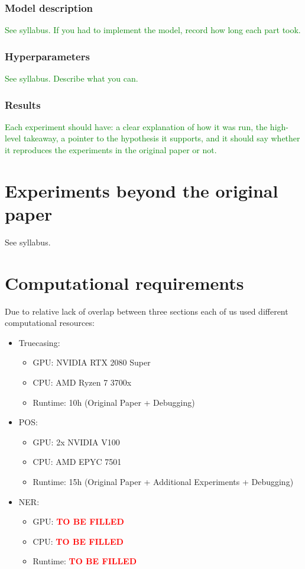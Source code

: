 \documentclass[11pt,a4paper]{article}
\begin{document}
    \subsubsection{Model description}
    \textcolor{green}{See syllabus. If you had to implement the model, record how long each part took.}

    \subsubsection{Hyperparameters}
    \textcolor{green}{See syllabus. Describe what you can.}

    \subsubsection{Results}
    \textcolor{green}{Each experiment should have: a clear explanation of how it was run, the high-level takeaway, a pointer to the hypothesis it supports, and it should say whether it reproduces the experiments in the original paper or not.}

\section{Experiments beyond the original paper}
See syllabus.

\section{Computational requirements}
Due to relative lack of overlap between three sections each of us used different computational resources:
\begin{itemize}
    \item Truecasing:
    \begin{itemize}
        \item GPU: NVIDIA RTX 2080 Super
        \item CPU: AMD Ryzen 7 3700x
        \item Runtime: 10h (Original Paper + Debugging)
    \end{itemize}
    \item POS:
    \begin{itemize}
        \item GPU: 2x NVIDIA V100
        \item CPU: AMD EPYC 7501
        \item Runtime: 15h (Original Paper + Additional Experiments + Debugging)
    \end{itemize}
    \item NER:
    \begin{itemize}
        \item GPU: \textbf{\textcolor{red}{TO BE FILLED}}
        \item CPU: \textbf{\textcolor{red}{TO BE FILLED}}
        \item Runtime: \textbf{\textcolor{red}{TO BE FILLED}}
    \end{itemize}
\end{itemize}
\end{document}
